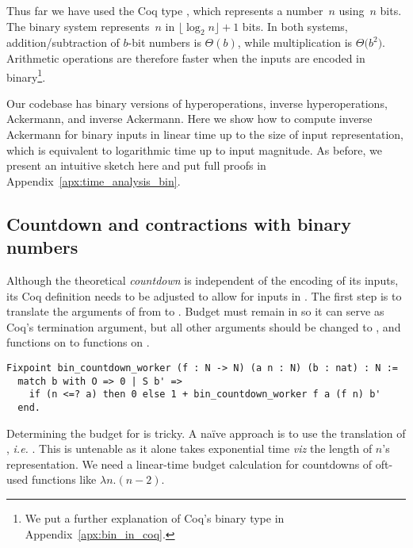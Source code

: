 
Thus far we have used the Coq type , which represents 
a number~$n$ using~$n$ bits. 
The binary system represents~$n$ in $\lfloor \log_{2} n \rfloor + 1$ bits.
In both systems, addition/subtraction of $b$-bit 
numbers is $\Theta(b)$, while multiplication is $\Theta \big(b^2\big)$. 
Arithmetic operations are therefore faster when the inputs 
are encoded in binary\footnote{We put a further explanation of 
Coq's binary type  in Appendix~\ref{apx:bin_in_coq}.}.

Our codebase has binary versions of hyperoperations, inverse hyperoperations, 
Ackermann, and inverse Ackermann. 
Here we show how to compute inverse Ackermann for binary inputs in 
linear time up to the size of input representation, 
which is equivalent to logarithmic time up to input magnitude.
As before, we present an intuitive sketch here and put 
full proofs in Appendix~\ref{apx:time_analysis_bin}.

\subsection{Countdown and contractions with binary numbers}

Although the theoretical \emph{countdown} is independent of the encoding 
of its inputs, its Coq definition needs to be adjusted to allow for inputs 
in . The first step is to translate the arguments of 
 from  to . Budget  must 
remain in  so it can serve as Coq's termination argument, 
but all other  arguments should be changed 
to , and functions on  to functions on .
\begin{lstlisting}
Fixpoint bin_countdown_worker (f : N -> N) (a n : N) (b : nat) : N :=
  match b with O => 0 | S b' => 
    if (n <=? a) then 0 else 1 + bin_countdown_worker f a (f n) b'
  end.
\end{lstlisting}
Determining the budget for  is tricky. 
A naïve approach is to use the  translation of , 
\emph{i.e.} . This is untenable as it alone 
takes exponential time \emph{viz} the length of $n$'s representation.
We need a linear-time budget calculation for countdowns 
of oft-used functions like $\lambda n.(n-2)$.

